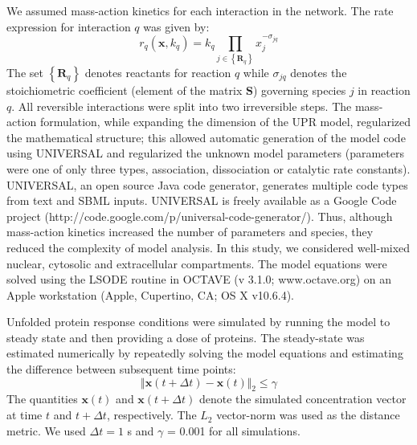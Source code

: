 \documentclass[12pt]{article}
\begin{document}
We assumed mass-action kinetics for each interaction in the network. 
The rate expression for interaction $q$ was given by:
\begin{equation}\label{eq-mass-action}
r_{q}\left(\mathbf{x},k_{q}\right)=k_{q}\prod_{j\in\left\{\mathbf{R}_{q}\right\}}x_{j}^{-\sigma_{jq}}
\end{equation}
The set $\left\{\mathbf{R}_{q}\right\}$ denotes reactants for reaction $q$ while $\sigma_{jq}$ denotes the stoichiometric coefficient (element of the matrix $\mathbf{S}$) governing species $j$ in reaction $q$. 
All reversible interactions were split into two irreversible steps. The mass-action formulation, while expanding the dimension of the UPR model, 
regularized the mathematical structure; this allowed automatic generation of the model code using UNIVERSAL and regularized the unknown model parameters (parameters were one of only three types, association, dissociation or catalytic rate constants).
UNIVERSAL, an open source Java code generator, generates multiple code types from text and SBML inputs.
UNIVERSAL is freely available as a Google Code project (http://code.google.com/p/universal-code-generator/). 
Thus, although mass-action kinetics increased the number of parameters and species, they reduced the complexity of model analysis. 
In this study, we considered well-mixed nuclear, cytosolic and extracellular compartments. 
The model equations were solved using the LSODE routine in OCTAVE (v 3.1.0; www.octave.org) on an Apple workstation (Apple, Cupertino, CA; OS X v10.6.4). 

Unfolded protein response conditions were simulated by running the model to steady state and then providing a dose of proteins. 
The steady-state was estimated numerically by repeatedly solving the model equations and estimating the difference between subsequent time points:
\begin{equation}
\Vert\mathbf{x}\left(t+\Delta{t}\right) - \mathbf{x}\left(t\right)\Vert_{2}\leq\gamma
\end{equation}
The quantities $\mathbf{x}\left(t\right)$ and $\mathbf{x}\left(t+\Delta{t}\right)$ denote the simulated concentration vector at time $t$ and $t + \Delta{t}$, respectively.
The $L_{2}$ vector-norm was used as the distance metric. 
We used $\Delta{t} = 1$ s and $\gamma$ = 0.001 for all simulations.
\end{document}
